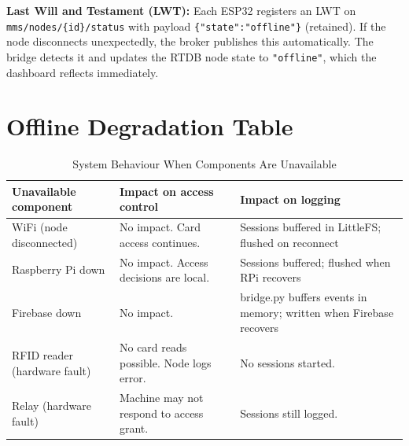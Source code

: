 \begin{notebox}
\textbf{Last Will and Testament (LWT):} Each ESP32 registers an LWT on \texttt{mms/nodes/\{id\}/status} with payload \texttt{\{"state":"offline"\}} (retained). If the node disconnects unexpectedly, the broker publishes this automatically. The bridge detects it and updates the RTDB node state to \texttt{"offline"}, which the dashboard reflects immediately.
\end{notebox}

\section{Offline Degradation Table}

\begin{table}[H]
\centering
\caption{System Behaviour When Components Are Unavailable}
\begin{tabular}{L{4cm}L{6cm}L{4.5cm}}
\toprule
\textbf{Unavailable component} & \textbf{Impact on access control} & \textbf{Impact on logging} \\
\midrule
WiFi (node disconnected) & No impact. Card access continues. & Sessions buffered in LittleFS; flushed on reconnect \\
Raspberry Pi down & No impact. Access decisions are local. & Sessions buffered; flushed when RPi recovers \\
Firebase down & No impact. & bridge.py buffers events in memory; written when Firebase recovers \\
RFID reader (hardware fault) & No card reads possible. Node logs error. & No sessions started. \\
Relay (hardware fault) & Machine may not respond to access grant. & Sessions still logged. \\
\bottomrule
\end{tabular}
\end{table}
